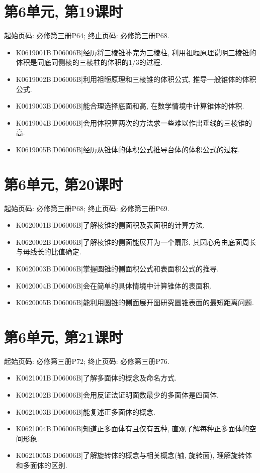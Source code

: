 \section*{第6单元, 第19课时}
起始页码: 必修第三册P64; 终止页码: 必修第三册P68.
\begin{itemize}
\item K0619001B|D06006B|经历将三棱锥补完为三棱柱, 利用祖暅原理说明三棱锥的体积是同底同侧棱的三棱柱的体积的$1/3$的过程.
\item K0619002B|D06006B|利用祖暅原理和三棱锥的体积公式, 推导一般锥体的体积公式.
\item K0619003B|D06006B|能合理选择底面和高, 在数学情境中计算锥体的体积.
\item K0619004B|D06006B|会用体积算两次的方法求一些难以作出垂线的三棱锥的高.
\item K0619005B|D06006B|经历从锥体的体积公式推导台体的体积公式的过程.
\end{itemize}

\section*{第6单元, 第20课时}
起始页码: 必修第三册P68; 终止页码: 必修第三册P69.
\begin{itemize}
\item K0620001B|D06006B|了解棱锥的侧面积及表面积的计算方法.
\item K0620002B|D06006B|了解棱锥的侧面能展开为一个扇形, 其圆心角由底面周长与母线长的比值确定.
\item K0620003B|D06006B|掌握圆锥的侧面积公式和表面积公式的推导.
\item K0620004B|D06006B|会在简单的具体情境中计算锥体的表面积.
\item K0620005B|D06006B|能利用圆锥的侧面展开图研究圆锥表面的最短距离问题.
\end{itemize}

\section*{第6单元, 第21课时}
起始页码: 必修第三册P72; 终止页码: 必修第三册P76.
\begin{itemize}
\item K0621001B|D06006B|了解多面体的概念及命名方式.
\item K0621002B|D06006B|会用反证法证明面数最少的多面体是四面体.
\item K0621003B|D06006B|能复述正多面体的概念.
\item K0621004B|D06006B|知道正多面体有且仅有五种, 直观了解每种正多面体的空间形象.
\item K0621005B|D06006B|了解旋转体的概念与相关概念(轴, 旋转面), 理解旋转体和多面体的区别.
\end{itemize}

